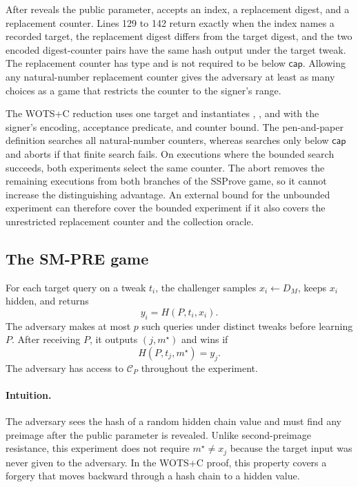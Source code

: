 \documentclass[11pt,a4paper]{article}
\theoremstyle{plain}
\theoremstyle{definition}
\DeclareRobustCommand{\coq}[1]{\texttt{\detokenize{#1}}}
\newcommand{\SSProve}{\textsf{SSProve}\xspace}
\newcommand{\WOTSC}{\textsf{WOTS+C}\xspace}
\begin{document}
After \coq{SGETPP} reveals the public parameter, \coq{SCHECK} accepts an index, a replacement digest, and a replacement counter.
Lines 129 to 142 return \coq{true} exactly when the index names a recorded target, the replacement digest differs from the target digest, and the two encoded digest-counter pairs have the same hash output under the target tweak.
The replacement counter has type \coq{nat} and is not required to be below \(\mathsf{cap}\).
Allowing any natural-number replacement counter gives the adversary at least as many choices as a game that restricts the counter to the signer's range.

The \WOTSC reduction uses one target and instantiates \coq{enc}, \coq{prp}, and \coq{cap} with the signer's encoding, acceptance predicate, and counter bound.
The pen-and-paper definition searches all natural-number counters, whereas \coq{SQUERY} searches only below \(\mathsf{cap}\) and aborts if that finite search fails.
On executions where the bounded search succeeds, both experiments select the same counter.
The abort removes the remaining executions from both branches of the \SSProve game, so it cannot increase the distinguishing advantage.
An external bound for the unbounded experiment can therefore cover the bounded experiment if it also covers the unrestricted replacement counter and the collection oracle.

\subsection{The SM-PRE game}

For each target query on a tweak \(t_i\), the challenger samples \(x_i\leftarrow D_M\), keeps \(x_i\) hidden, and returns
\[
  y_i=H(P,t_i,x_i).
\]
The adversary makes at most \(p\) such queries under distinct tweaks before learning \(P\).
After receiving \(P\), it outputs \((j,m^\star)\) and wins if
\begin{equation}
\label{eq:smpre-definition}
  H(P,t_j,m^\star)=y_j.
\end{equation}
The adversary has access to \(\mathcal C_P\) throughout the experiment.

\paragraph{Intuition.}
The adversary sees the hash of a random hidden chain value and must find any preimage after the public parameter is revealed.
Unlike second-preimage resistance, this experiment does not require \(m^\star\ne x_j\) because the target input was never given to the adversary.
In the \WOTSC proof, this property covers a forgery that moves backward through a hash chain to a hidden value.
\end{document}
